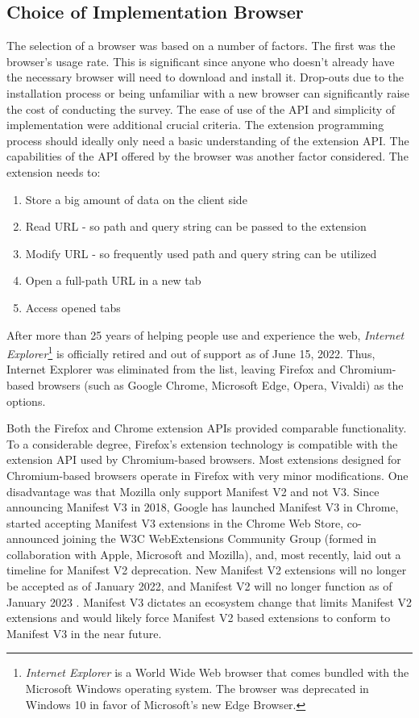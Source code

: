 \subsection{Choice of Implementation Browser}
The selection of a browser was based on a number of factors. The first was the browser's usage rate. This is significant since anyone who doesn't already have the necessary browser will need to download and install it. Drop-outs due to the installation process or being unfamiliar with a new browser can significantly raise the cost of conducting the survey. The ease of use of the API and simplicity of implementation were additional crucial criteria. The extension programming process should ideally only need a basic understanding of the extension API. The capabilities of the API offered by the browser was another factor considered. The extension needs to:

\begin{enumerate}
  \item Store a big amount of data on the client side
  \item Read URL - so path and query string can be passed to the extension
  \item Modify URL - so frequently used path and query string can be utilized
  \item Open a full-path URL in a new tab
  \item Access opened tabs
\end{enumerate}

After more than 25 years of helping people use and experience the web, \emph{Internet Explorer}\footnote{\emph{Internet Explorer} is a World Wide Web browser that comes bundled with the Microsoft Windows operating system. The browser was deprecated in Windows 10 in favor of Microsoft's new Edge Browser.} is officially retired and out of support as of June 15, 2022. Thus, Internet Explorer was eliminated from the list, leaving Firefox and Chromium-based browsers (such as Google Chrome, Microsoft Edge, Opera, Vivaldi) as the options.

Both the Firefox and Chrome extension APIs provided comparable functionality. To a considerable degree, Firefox's extension technology is compatible with the extension API used by Chromium-based browsers. Most extensions designed for Chromium-based browsers operate in Firefox with very minor modifications. One disadvantage was that Mozilla only support Manifest V2 and not V3. Since announcing Manifest V3 in 2018, Google has launched Manifest V3 in Chrome, started accepting Manifest V3 extensions in the Chrome Web Store, co-announced joining the W3C WebExtensions Community Group (formed in collaboration with Apple, Microsoft and Mozilla), and, most recently, laid out a timeline for Manifest V2 deprecation. New Manifest V2 extensions will no longer be accepted as of January 2022, and Manifest V2 will no longer function as of January 2023 \autocite{alexei2021manifest}. Manifest V3 dictates an ecosystem change that limits Manifest V2 extensions and would likely force Manifest V2 based extensions to conform to Manifest V3 in the near future.

